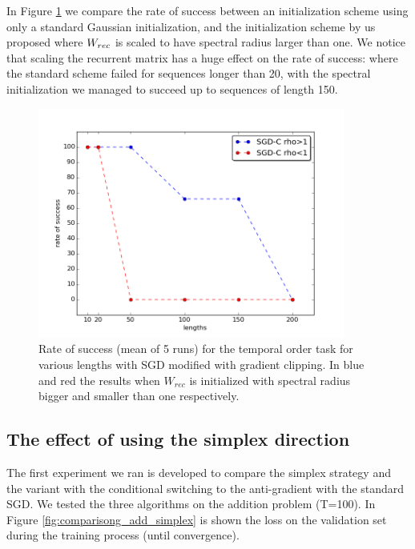 In Figure \ref{fig:temporal_rates} we compare the rate of success between an initialization scheme using only a standard Gaussian initialization, and the initialization scheme by us proposed where $W_{rec}$ is scaled to have spectral radius larger than one. We notice that scaling the recurrent matrix has a huge effect on the rate of success: where the standard scheme failed for sequences longer than 20, with the spectral initialization we managed to succeed up to sequences of length 150.

\begin{figure}
	\centering
	\includegraphics[width= 0.9\textwidth]{chapter4/temporal_rates.png}
	\caption{Rate of success (mean of 5 runs) for the temporal order task for various lengths with SGD modified with gradient clipping. In blue and red the results when $W_{rec}$ is initialized with spectral radius bigger and smaller than one respectively.}
	\label{fig:temporal_rates}
\end{figure}



\subsection{The effect of using the simplex direction}
The first experiment we ran is developed to compare the simplex strategy and the variant with the conditional switching to the anti-gradient with the standard SGD. We tested the three algorithms on the addition problem (T=100). In Figure \ref{fig:comparisong_add_simplex} is shown the loss on the validation set during the training process (until convergence). 

